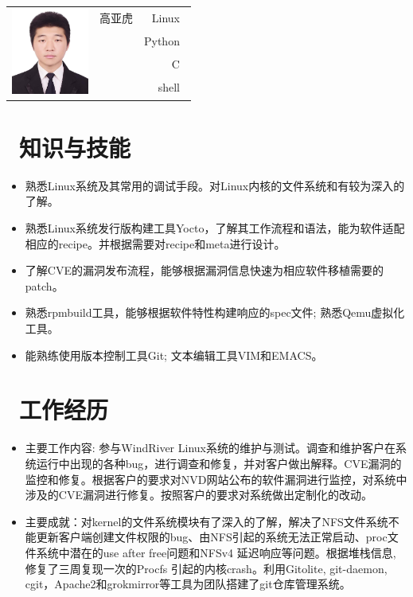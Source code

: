 \documentclass{resume}
\begin{document}
\Large{
  \begin{tabu}{ c l r }
     & \scshape{高亚虎} & {Linux~} \\
    &  & {Python~} \\
    &  & {C~} \\
    &  & {shell~}
  \end{tabu}
}
\section{\faGraduationCap\ 知识与技能}\normalsize
\begin{itemize}
  \item {熟悉Linux系统及其常用的调试手段。对Linux内核的文件系统和有较为深入的了解。}
  \item {熟悉Linux系统发行版构建工具Yocto，了解其工作流程和语法，能为软件适配相应的recipe。并根据需要对recipe和meta进行设计。}
  \item {了解CVE的漏洞发布流程，能够根据漏洞信息快速为相应软件移植需要的patch。}
  \item {熟悉rpmbuild工具，能够根据软件特性构建响应的spec文件; 熟悉Qemu虚拟化工具。}
  \item {能熟练使用版本控制工具Git; 文本编辑工具VIM和EMACS。}
  \end{itemize}

\section{\faUsers\ 工作经历}\normalsize
{}
\begin{itemize}
\item {主要工作内容: 参与WindRiver Linux系统的维护与测试。调查和维护客户在系统运行中出现的各种bug，进行调查和修复，并对客户做出解释。CVE漏洞的监控和修复。根据客户的要求对NVD网站公布的软件漏洞进行监控，对系统中涉及的CVE漏洞进行修复。按照客户的要求对系统做出定制化的改动。}
\item {主要成就：对kernel的文件系统模块有了深入的了解，解决了NFS文件系统不能更新客户端创建文件权限的bug、由NFS引起的系统无法正常启动、proc文件系统中潜在的use after free问题和NFSv4 延迟响应等问题。根据堆栈信息, 修复了三周复现一次的Procfs 引起的内核crash。利用Gitolite, git-daemon, cgit，Apache2和grokmirror等工具为团队搭建了git仓库管理系统。}
  \end{itemize}
\end{document}

